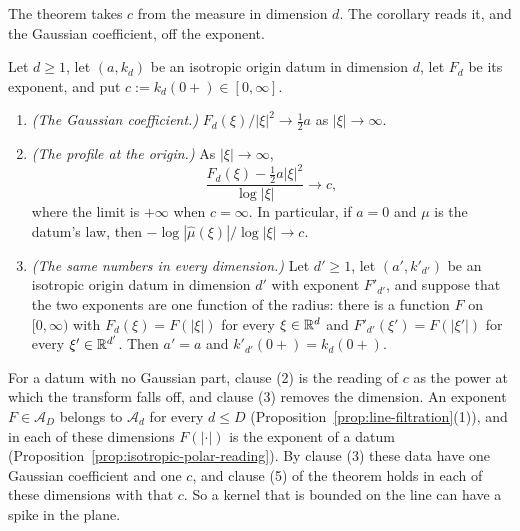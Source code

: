 The theorem takes $c$ from the \Levy{} measure in dimension $d$. The corollary reads it, and the
Gaussian coefficient, off the exponent.

\begin{corollary}\label{cor:origin-profile-exponent}
Let $d \ge 1$, let $(a, k_d)$ be an isotropic origin datum in dimension $d$, let $F_d$ be its
exponent, and put $c := k_d(0{+}) \in [0,\infty]$.
\begin{enumerate}
\item \emph{(The Gaussian coefficient.)} $F_d(\xi)/|\xi|^2 \to \tfrac12 a$ as $|\xi| \to \infty$.
\item \emph{(The profile at the origin.)} As $|\xi| \to \infty$,
\[
  \frac{F_d(\xi) - \tfrac12 a|\xi|^2}{\log|\xi|} \to c ,
\]
where the limit is $+\infty$ when $c = \infty$. In particular, if $a = 0$ and $\mu$ is the datum's
law, then $-\log|\widehat\mu(\xi)|/\log|\xi| \to c$.
\item \emph{(The same numbers in every dimension.)} Let $d' \ge 1$, let $(a', k'_{d'})$ be an
isotropic origin datum in dimension $d'$ with exponent $F'_{d'}$, and suppose that the two exponents
are one function of the radius: there is a function $F$ on $[0,\infty)$ with $F_d(\xi) = F(|\xi|)$
for every $\xi \in \mathbb{R}^d$ and $F'_{d'}(\xi') = F(|\xi'|)$ for every $\xi' \in \mathbb{R}^{d'}$. Then
$a' = a$ and $k'_{d'}(0{+}) = k_d(0{+})$.
\end{enumerate}
\end{corollary}

For a datum with no Gaussian part, clause (2) is the reading of $c$ as the power at which the
transform falls off, and clause (3) removes the dimension. An exponent
$F \in \mathcal{A}_D$ belongs to $\mathcal{A}_d$ for every $d \le D$
(Proposition~\ref{prop:line-filtration}(1)), and in each of these dimensions $F(|\cdot|)$ is the
exponent of a datum (Proposition~\ref{prop:isotropic-polar-reading}). By clause (3) these data
have one Gaussian coefficient and one $c$, and clause (5) of the theorem holds in each of these
dimensions with that $c$. So a kernel that is bounded on the line can have a spike in the plane.


